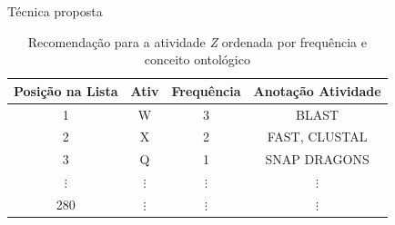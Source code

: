 %		
%			

\begin{frame}		
	\begin{block}{Técnica proposta}
\begin{table}[!htb]
	\centering
	\begin{tabular}{|c|c|c|c|}  \hline
		\textbf{Posição na Lista} & \textbf{Ativ} & \textbf{Frequência} & \textbf{Anotação Atividade} 	\\ \hline
		1				& W 				& 3 				& BLAST				\\ \hline
		2				& X 				& 2 				& FAST, CLUSTAL		\\ \hline
		3				& Q 				& 1 				& SNAP DRAGONS		\\ \hline
		\(\vdots\)		& \(\vdots\)		& \(\vdots\) 		& \(\vdots\)		\\ \hline
		280				& \(\vdots\)		& \(\vdots\)		& \(\vdots\)	\\ \hline
	\end{tabular}
	\caption{Recomendação para a atividade \emph{Z} ordenada por frequência e conceito ontológico}
	\label{tabela_lista_recomendacao_ordenada_frequencia}
\end{table}
	\end{block}
\end{frame}

